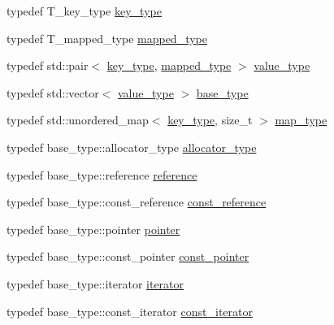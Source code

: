 \begin{DoxyCompactItemize}
\item 
typedef T\+\_\+key\+\_\+type \hyperlink{classIceBRG_1_1insertion__ordered__map_a89f1c1aa5a0c6d1a681a0957092bb738}{key\+\_\+type}
\item 
typedef T\+\_\+mapped\+\_\+type \hyperlink{classIceBRG_1_1insertion__ordered__map_a4ab99f9f37138d3239735b5ff4aac2e5}{mapped\+\_\+type}
\item 
typedef std\+::pair$<$ \hyperlink{classIceBRG_1_1insertion__ordered__map_a89f1c1aa5a0c6d1a681a0957092bb738}{key\+\_\+type}, \hyperlink{classIceBRG_1_1insertion__ordered__map_a4ab99f9f37138d3239735b5ff4aac2e5}{mapped\+\_\+type} $>$ \hyperlink{classIceBRG_1_1insertion__ordered__map_a3d6c2c7983b7feaab115020ca240d73c}{value\+\_\+type}
\item 
typedef std\+::vector$<$ \hyperlink{classIceBRG_1_1insertion__ordered__map_a3d6c2c7983b7feaab115020ca240d73c}{value\+\_\+type} $>$ \hyperlink{classIceBRG_1_1insertion__ordered__map_afac747acefbbac2509113178f93cee10}{base\+\_\+type}
\item 
typedef std\+::unordered\+\_\+map$<$ \hyperlink{classIceBRG_1_1insertion__ordered__map_a89f1c1aa5a0c6d1a681a0957092bb738}{key\+\_\+type}, size\+\_\+t $>$ \hyperlink{classIceBRG_1_1insertion__ordered__map_a934f40368284ca35feac3413f95fe4a9}{map\+\_\+type}
\item 
typedef base\+\_\+type\+::allocator\+\_\+type \hyperlink{classIceBRG_1_1insertion__ordered__map_affacbb9577d346f764974b169f73e762}{allocator\+\_\+type}
\item 
typedef base\+\_\+type\+::reference \hyperlink{classIceBRG_1_1insertion__ordered__map_a22138af723d72d95d476af6baae7c130}{reference}
\item 
typedef base\+\_\+type\+::const\+\_\+reference \hyperlink{classIceBRG_1_1insertion__ordered__map_a31d0718377868da407efc5e3c099bb72}{const\+\_\+reference}
\item 
typedef base\+\_\+type\+::pointer \hyperlink{classIceBRG_1_1insertion__ordered__map_a55d30074a56e43059e08952287eec04a}{pointer}
\item 
typedef base\+\_\+type\+::const\+\_\+pointer \hyperlink{classIceBRG_1_1insertion__ordered__map_a7cea6f693fc996cb361c9e18a3073db2}{const\+\_\+pointer}
\item 
typedef base\+\_\+type\+::iterator \hyperlink{classIceBRG_1_1insertion__ordered__map_ac41b1e73bdb41c7b45da36e8eca7fb70}{iterator}
\item 
typedef base\+\_\+type\+::const\+\_\+iterator \hyperlink{classIceBRG_1_1insertion__ordered__map_a69d0d661aae3e27da8aafc22b6db8950}{const\+\_\+iterator}

\end{DoxyCompactItemize}
